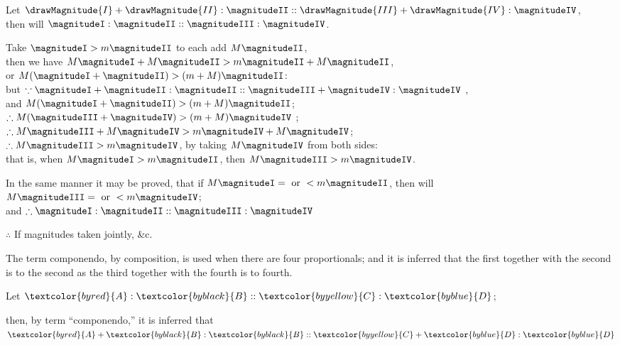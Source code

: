 \documentclass[booklanguage=english]{byrnebook}
\begin{document}
\begin{center}
Let $\drawMagnitude{I} + \drawMagnitude{II} : \magnitudeII :: \drawMagnitude{III} + \drawMagnitude{IV} : \magnitudeIV$,\\
then will $\magnitudeI : \magnitudeII :: \magnitudeIII : \magnitudeIV$.

Take $\magnitudeI > m \magnitudeII$ to each add $M \magnitudeII$,\\
then we have $M \magnitudeI + M \magnitudeII > m \magnitudeII + M \magnitudeII$,\\
or $M (\magnitudeI + \magnitudeII) > (m + M) \magnitudeII$:\\
but $\because \magnitudeI + \magnitudeII: \magnitudeII :: \magnitudeIII + \magnitudeIV: \magnitudeIV$ \byref{\hypref},\\ %
and $M (\magnitudeI + \magnitudeII) > (m + M) \magnitudeII$;\\
$\therefore M(\magnitudeIII + \magnitudeIV) > (m + M) \magnitudeIV$ ;\\
$\therefore M \magnitudeIII + M \magnitudeIV > m \magnitudeIV + M \magnitudeIV$;\\
$\therefore M \magnitudeIII > m \magnitudeIV$, by taking $M \magnitudeIV$ from both sides:\\
that is, when $M \magnitudeI > m \magnitudeII$, then $M \magnitudeIII > m \magnitudeIV$.

In the same manner it may be proved, that if $M \magnitudeI = \mbox{ or } < m \magnitudeII$, then will $M \magnitudeIII = \mbox{ or } < m \magnitudeIV$;\\
and $\therefore \magnitudeI : \magnitudeII :: \magnitudeIII : \magnitudeIV$ 

$\therefore$ If magnitudes taken jointly, \&c.
\end{center}

\vfill\pagebreak

\def\varA{\textcolor{byred}{A}}
\def\varB{\textcolor{byblack}{B}}
\def\varC{\textcolor{byyellow}{C}}
\def\varD{\textcolor{byblue}{D}}
The term componendo, by composition, is used when there are four proportionals; and it is inferred that the first together with the second is to the second as the third together with the fourth is to fourth.

\begin{center}
Let $\varA : \varB :: \varC : \varD$;

then, by term \enquote{componendo,} it is inferred that\\
$\varA + \varB : \varB :: \varC + \varD: \varD$
\end{center}
\end{document}
